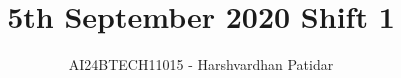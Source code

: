 \documentclass[journal]{IEEEtran}
\begin{document}

\vspace{3cm}

\title{5th September 2020 Shift 1}
\author{AI24BTECH11015 - Harshvardhan Patidar}
 \maketitle
{\let\newpage\relax\maketitle}

\renewcommand{\thefigure}{\theenumi}
\renewcommand{\thetable}{\theenumi}
\setlength{\intextsep}{10pt} %


\renewcommand{\thetable}{\theenumi}
\end{document}

